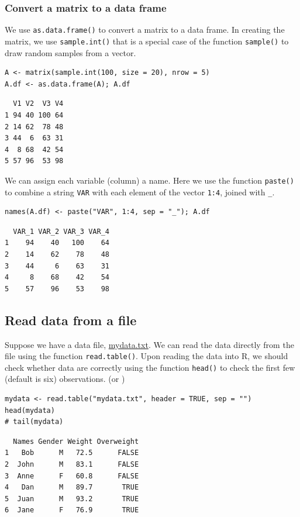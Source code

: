 \documentclass[a4paper,11pt]{article}
\begin{document}
\subsubsection*{Convert a matrix to a data frame}
\label{sec:org5ad5633}

We use \texttt{as.data.frame()} to convert a matrix to a data frame. In
creating the matrix, we use \texttt{sample.int()} that is a special case of
the function \texttt{sample()} to draw random samples from a vector.
\begin{verbatim}
A <- matrix(sample.int(100, size = 20), nrow = 5)
A.df <- as.data.frame(A); A.df
\end{verbatim}

\begin{verbatim}
  V1 V2  V3 V4
1 94 40 100 64
2 14 62  78 48
3 44  6  63 31
4  8 68  42 54
5 57 96  53 98
\end{verbatim}

We can assign each variable (column) a name. Here we use the function
\texttt{paste()} to combine a string \texttt{VAR} with each element of the vector
\texttt{1:4}, joined with \texttt{\_}.
\begin{verbatim}
names(A.df) <- paste("VAR", 1:4, sep = "_"); A.df
\end{verbatim}

\begin{verbatim}
  VAR_1 VAR_2 VAR_3 VAR_4
1    94    40   100    64
2    14    62    78    48
3    44     6    63    31
4     8    68    42    54
5    57    96    53    98
\end{verbatim}


\subsection{Read data from a file}
\label{sec:orgd6cde62}

Suppose we have a data file, \url{mydata.txt}. We can read the data
directly from the file using the function \texttt{read.table()}. Upon reading
the data into R, we should check whether data are correctly using the
function \texttt{head()} to check the first few (default is six)
observations. (or )

\begin{verbatim}
mydata <- read.table("mydata.txt", header = TRUE, sep = "")
head(mydata)
# tail(mydata)
\end{verbatim}

\begin{verbatim}
  Names Gender Weight Overweight
1   Bob      M   72.5      FALSE
2  John      M   83.1      FALSE
3  Anne      F   60.8      FALSE
4   Dan      M   89.7       TRUE
5  Juan      M   93.2       TRUE
6  Jane      F   76.9       TRUE
\end{verbatim}
\end{document}
